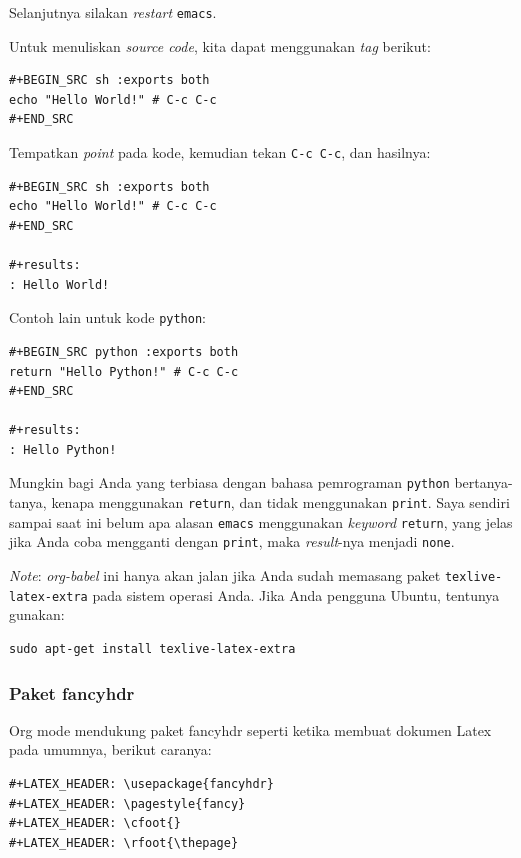 \documentclass{article}
\begin{document}
Selanjutnya silakan \emph{restart} \verb=emacs=.

Untuk menuliskan \emph{source code}, kita dapat menggunakan \emph{tag} berikut:

\begin{verbatim}
#+BEGIN_SRC sh :exports both
echo "Hello World!" # C-c C-c
#+END_SRC
\end{verbatim}

Tempatkan \emph{point} pada kode, kemudian tekan \verb=C-c C-c=, dan hasilnya:

\begin{verbatim}
#+BEGIN_SRC sh :exports both
echo "Hello World!" # C-c C-c
#+END_SRC

#+results:
: Hello World!
\end{verbatim}

Contoh lain untuk kode \verb=python=:

\begin{verbatim}
#+BEGIN_SRC python :exports both
return "Hello Python!" # C-c C-c
#+END_SRC

#+results:
: Hello Python!
\end{verbatim}

Mungkin bagi Anda yang terbiasa dengan bahasa pemrograman \verb=python= 
bertanya-tanya, kenapa menggunakan \verb=return=, dan tidak menggunakan
\verb=print=. Saya sendiri sampai saat ini belum apa alasan \verb=emacs=
menggunakan \emph{keyword} \verb=return=, yang jelas jika Anda coba 
mengganti dengan \verb=print=, maka \emph{result}-nya menjadi
\verb=none=.

\emph{Note}: \emph{org-babel} ini hanya akan jalan jika Anda sudah 
memasang paket \verb=texlive-latex-extra= pada sistem operasi Anda. Jika
Anda pengguna Ubuntu, tentunya gunakan:

\begin{verbatim}
sudo apt-get install texlive-latex-extra
\end{verbatim}

\subsubsection{Paket fancyhdr}
Org mode mendukung paket fancyhdr seperti ketika membuat dokumen Latex
pada umumnya, berikut caranya:

\begin{verbatim}
#+LATEX_HEADER: \usepackage{fancyhdr}
#+LATEX_HEADER: \pagestyle{fancy}
#+LATEX_HEADER: \cfoot{}
#+LATEX_HEADER: \rfoot{\thepage}
\end{verbatim}
\end{document}
